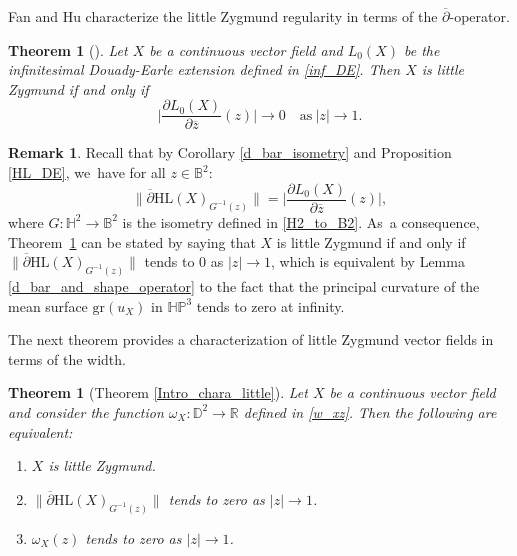 \documentclass[JEP,XML,SOM,Unicode,NoEqCountersInSection, NoFloatCountersInSection,published]{cedram}
\theoremstyle{plain}
\newtheorem{theorem}[cor]{Theorem}
\theoremstyle{definition}
\newtheorem{remark}[cor]{Remark}
\newcommand{\HP}{\mathbb{HP}^3}
\begin{document}
Fan and Hu characterize the little Zygmund regularity in terms of the $\overline{\partial}$-operator.
\begin{theorem}[{\cite[Th.\,3]{FanJun}}]\label{fan_hu_little}
Let $X$ be a continuous vector field and $L_0(X)$ be the infinitesimal Douady-Earle extension defined in \eqref{inf_DE}. Then $X$ is little Zygmund if and only if\vspace*{-3pt}
\[
\biggl|\frac{\partial L_0(X)}{\partial \overline{z}}(z)\biggr| \to 0 \quad \text{as}\ \lvert z\rvert\to 1.
\]
\end{theorem}
\begin{remark}\label{remark_little_zygmund}
Recall that by Corollary \ref{d_bar_isometry} and Proposition \ref{HL_DE}, we~have for all \(z \in \mathbb{B}^2\):\vspace*{-3pt}
\begin{equation}
\lVert \overline{\partial} \mathrm{HL}(X)_{G^{-1}(z)} \rVert = \biggl| \frac{\partial L_0(X)}{\partial \overline{z}}(z) \biggr|,
\end{equation}
where \(G: \mathbb{H}^2 \to \mathbb{B}^2\) is the isometry defined in \eqref{H2_to_B2}. As~a consequence, Theorem~\ref{fan_hu_little} can be stated by saying that \(X\) is little Zygmund if and only if
\(\lVert \overline{\partial} \mathrm{HL}(X)_{G^{-1}(z)} \rVert\) tends to $0$ as \(\lvert z \rvert \to 1\), which is equivalent by Lemma \ref{d_bar_and_shape_operator} to the fact that the principal curvature of the mean surface \(\mathrm{gr}(u_X)\) in \(\HP\) tends to zero at infinity.
\end{remark}

The next theorem provides a characterization of little Zygmund vector fields in terms of the width.

\begin{theorem}[Theorem \ref{Intro_chara_little}]\label{LZVF}
\label{width_goes_to_0}
Let $X$ be a continuous vector field and consider the function $\omega_{X}:\mathbb{D}^2\to \mathbb{R}$ defined in \eqref{w_xz}. Then the following are equivalent:
\begin{enumerate}
\item\label{LZVF1} $X$ is little Zygmund.
\item\label{LZVF2} $\lVert \overline{\partial}\mathrm{HL}(X)_{G^{-1}(z)}\rVert$ tends to zero as $\lvert z\rvert\to 1$.
\item\label{LZVF3} $\omega_X(z)$ tends to zero as $\lvert z\rvert\to 1$.
\end{enumerate}
\end{theorem}
\end{document}

